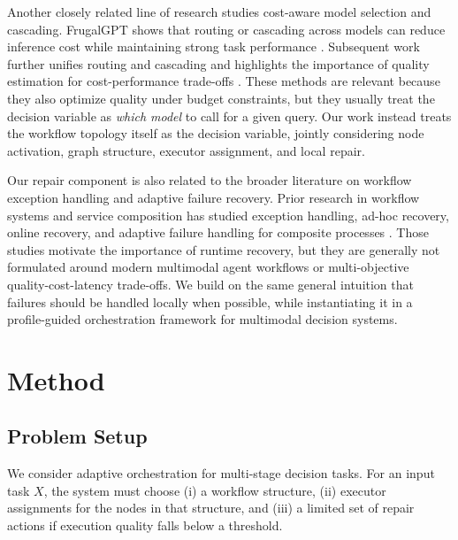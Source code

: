 \documentclass[manuscript,review,anonymous]{acmart}
\begin{document}
Another closely related line of research studies cost-aware model selection and cascading. FrugalGPT shows that routing or cascading across models can reduce inference cost while maintaining strong task performance \cite{chen2023frugalgpt}. Subsequent work further unifies routing and cascading and highlights the importance of quality estimation for cost-performance trade-offs \cite{dekoninck2024routing,gao2024constraintaware,liu2024risk}. These methods are relevant because they also optimize quality under budget constraints, but they usually treat the decision variable as \emph{which model} to call for a given query. Our work instead treats the workflow topology itself as the decision variable, jointly considering node activation, graph structure, executor assignment, and local repair.

Our repair component is also related to the broader literature on workflow exception handling and adaptive failure recovery. Prior research in workflow systems and service composition has studied exception handling, ad-hoc recovery, online recovery, and adaptive failure handling for composite processes \cite{chiu2001exception,sato2010adaff,hutter2023online,wang2023adaptive}. Those studies motivate the importance of runtime recovery, but they are generally not formulated around modern multimodal agent workflows or multi-objective quality-cost-latency trade-offs. We build on the same general intuition that failures should be handled locally when possible, while instantiating it in a profile-guided orchestration framework for multimodal decision systems.









\section{Method}
\label{sec:method}

\subsection{Problem Setup}

We consider adaptive orchestration for multi-stage decision tasks. For an input task $X$, the system must choose (i) a workflow structure, (ii) executor assignments for the nodes in that structure, and (iii) a limited set of repair actions if execution quality falls below a threshold.
\end{document}
